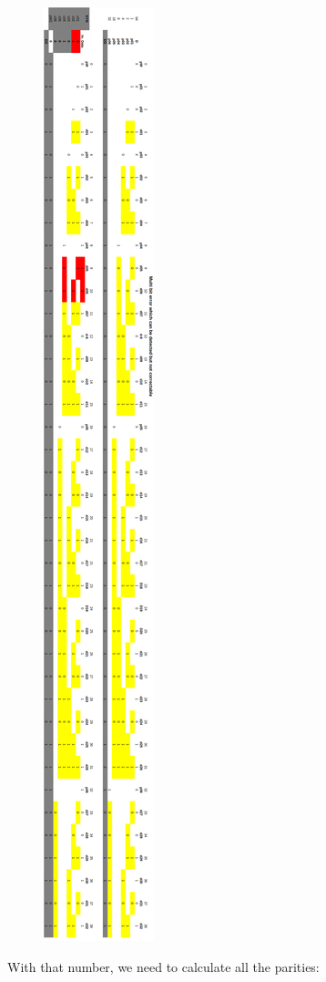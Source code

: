 \documentclass[a4paper,11pt]{article}%
\newenvironment{qanda}{\setlength{\parindent}{0pt}}{\bigskip}
\begin{document}
\begin{qanda}
\begin{figure}[H]
	\includegraphics[scale=0.6]{figures/q2.png}
\end{figure}
	
	With that number, we need to calculate all the parities:
	

\end{qanda}
\end{document}
